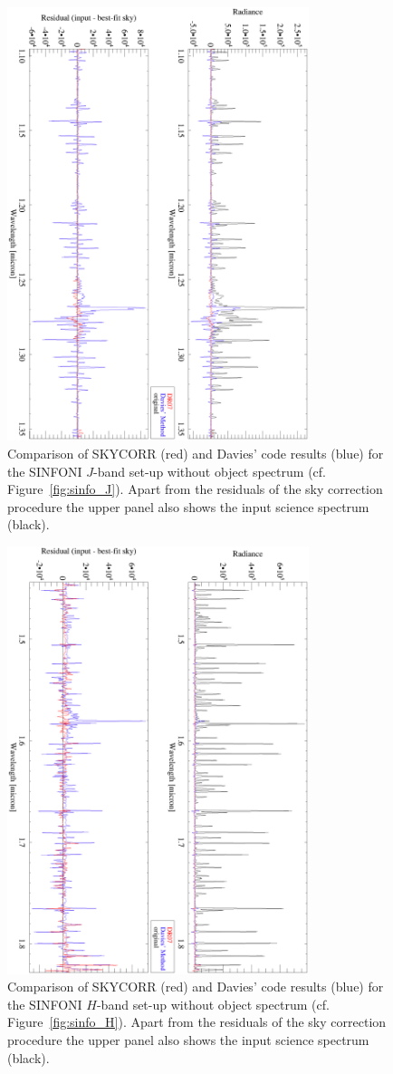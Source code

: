 \begin{figure}
\centering
\includegraphics[width=8.8cm,clip=true,angle=90]
{figures/TEST-SINFO-J_comp.eps}
\caption[]{Comparison of SKYCORR (red) and Davies' code results (blue) for the
SINFONI $J$-band set-up without object spectrum (cf. Figure~\ref{fig:sinfo_J}).
Apart from the residuals of the sky correction procedure the upper panel also
shows the input science spectrum (black).}
\label{fig:sinfo_J_comp}
\end{figure}

\begin{figure}
\centering
\includegraphics[width=8.8cm,clip=true,angle=90]
{figures/TEST-SINFO-H_comp.eps}
\caption[]{Comparison of SKYCORR (red) and Davies' code results (blue) for the
SINFONI $H$-band set-up without object spectrum (cf. Figure~\ref{fig:sinfo_H}).
Apart from the residuals of the sky correction procedure the upper panel also
shows the input science spectrum (black).}
\label{fig:sinfo_H_comp}
\end{figure}

